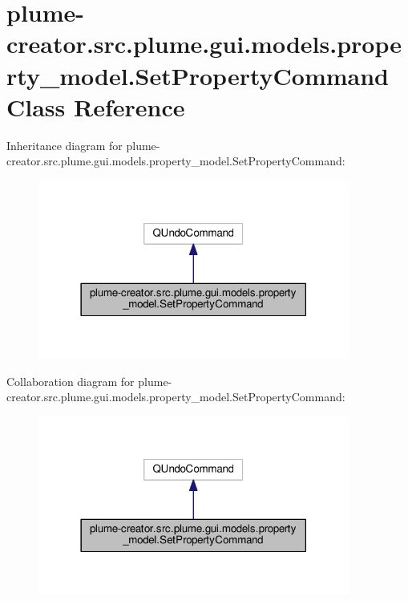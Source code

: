 \hypertarget{classplume-creator_1_1src_1_1plume_1_1gui_1_1models_1_1property__model_1_1_set_property_command}{}\section{plume-\/creator.src.\+plume.\+gui.\+models.\+property\+\_\+model.\+Set\+Property\+Command Class Reference}
\label{classplume-creator_1_1src_1_1plume_1_1gui_1_1models_1_1property__model_1_1_set_property_command}


Inheritance diagram for plume-\/creator.src.\+plume.\+gui.\+models.\+property\+\_\+model.\+Set\+Property\+Command\+:\nopagebreak
\begin{figure}[H]
\begin{center}
\leavevmode
\includegraphics[width=290pt]{classplume-creator_1_1src_1_1plume_1_1gui_1_1models_1_1property__model_1_1_set_property_command__inherit__graph}
\end{center}
\end{figure}


Collaboration diagram for plume-\/creator.src.\+plume.\+gui.\+models.\+property\+\_\+model.\+Set\+Property\+Command\+:\nopagebreak
\begin{figure}[H]
\begin{center}
\leavevmode
\includegraphics[width=290pt]{classplume-creator_1_1src_1_1plume_1_1gui_1_1models_1_1property__model_1_1_set_property_command__coll__graph}
\end{center}
\end{figure}
